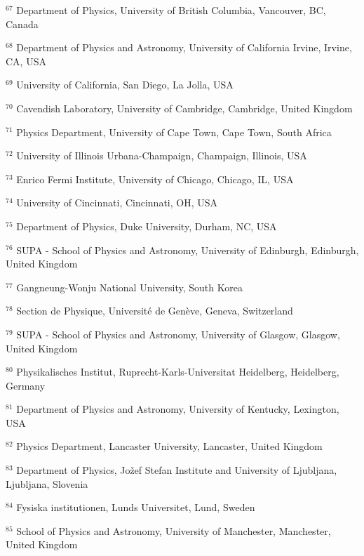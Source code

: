 \par {\footnotesize $^{67}$ Department of Physics, University of British Columbia, Vancouver, BC, Canada}
\par {\footnotesize $^{68}$ Department of Physics and Astronomy, University of California Irvine, Irvine, CA, USA}
\par {\footnotesize $^{69}$ University of California, San Diego, La Jolla, USA}
\par {\footnotesize $^{70}$ Cavendish Laboratory, University of Cambridge, Cambridge, United Kingdom}
\par {\footnotesize $^{71}$ Physics Department, University of Cape Town, Cape Town, South Africa}
\par {\footnotesize $^{72}$ University of Illinois Urbana-Champaign, Champaign, Illinois, USA}
\par {\footnotesize $^{73}$ Enrico Fermi Institute, University of Chicago, Chicago, IL, USA}
\par {\footnotesize $^{74}$ University of Cincinnati, Cincinnati, OH, USA}
\par {\footnotesize $^{75}$ Department of Physics, Duke University, Durham, NC, USA}
\par {\footnotesize $^{76}$ SUPA - School of Physics and Astronomy, University of Edinburgh, Edinburgh, United Kingdom}
\par {\footnotesize $^{77}$ Gangneung-Wonju National University, South Korea}
\par {\footnotesize $^{78}$ Section de Physique, Université de Genève, Geneva, Switzerland}
\par {\footnotesize $^{79}$ SUPA - School of Physics and Astronomy, University of Glasgow, Glasgow, United Kingdom}
\par {\footnotesize $^{80}$ Physikalisches Institut, Ruprecht-Karls-Universitat Heidelberg, Heidelberg, Germany}
\par {\footnotesize $^{81}$ Department of Physics and Astronomy, University of Kentucky, Lexington, USA}
\par {\footnotesize $^{82}$ Physics Department, Lancaster University, Lancaster, United Kingdom}
\par {\footnotesize $^{83}$ Department of Physics, Jožef Stefan Institute and University of Ljubljana, Ljubljana, Slovenia}
\par {\footnotesize $^{84}$ Fysiska institutionen, Lunds Universitet, Lund, Sweden}
\par {\footnotesize $^{85}$ School of Physics and Astronomy, University of Manchester, Manchester, United Kingdom}
